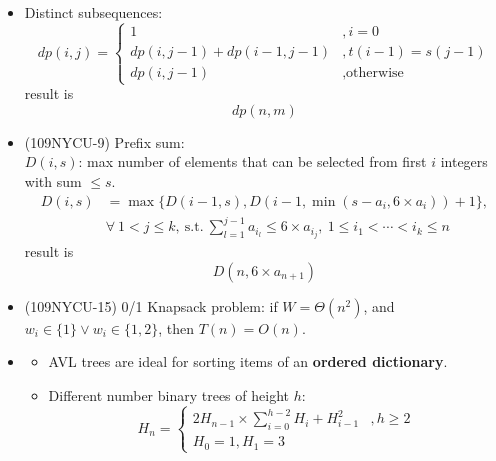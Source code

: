 \begin{itemize}
    \item Distinct subsequences: \begin{equation}
        dp(i, j) = \begin{cases}
            1 &, i = 0 \\
            dp(i, j - 1) + dp(i - 1, j - 1) &, t(i - 1) = s(j - 1) \\
            dp(i, j - 1) &, \text{otherwise}
        \end{cases}            
    \end{equation} result is \begin{equation}
        dp(n, m)
    \end{equation}
    \item (109NYCU-9) Prefix sum: \\
    $D(i, s)$: max number of elements that can be selected from first $i$ integers with sum $\le s$. \begin{equation}
        \begin{aligned}
            D(i, s) & = \max\{D(i - 1, s), D(i - 1, \min(s - a_i, 6 \times a_i)) + 1\}, \\
            & \forall \ 1 < j \le k, \ \text{s.t.} \ \sum_{l = 1}^{j - 1}a_{i_l} \le 6 \times a_{i_j}, \ 1 \le i_1 < \cdots < i_k \le n
        \end{aligned}
    \end{equation} result is \begin{equation}
        D(n, 6 \times a_{n + 1})
    \end{equation}
    \item (109NYCU-15) 0/1 Knapsack problem: if $W = \Theta(n^2)$, and $w_i \in \{1\} \lor w_i \in \{1, 2\}$, then $T(n) = O(n)$.
    \item \quad\quad \begin{itemize}
        \item AVL trees are ideal for sorting items of an \textbf{ordered dictionary}.
        \item Different number binary trees of height $h$: \begin{equation}
            H_n = \begin{cases}
                2H_{n - 1} \times \sum\limits_{i = 0}^{h - 2}H_i + H_{i - 1}^2 &, h \ge 2\\
                H_0 = 1, H_1 = 3 
            \end{cases}
        \end{equation}
    \end{itemize}
\end{itemize}

\pagebreak
